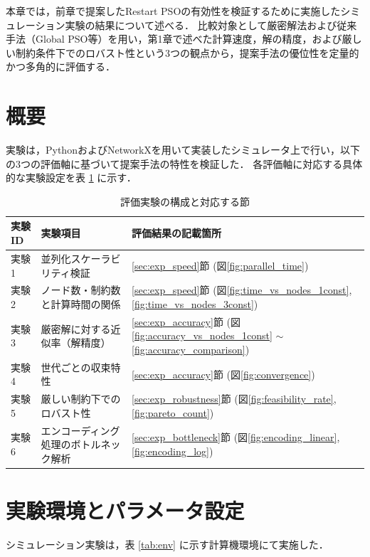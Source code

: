 
本章では，前章で提案したRestart PSOの有効性を検証するために実施したシミュレーション実験の結果について述べる．
比較対象として厳密解法および従来手法（Global PSO等）を用い，第1章で述べた計算速度，解の精度，および厳しい制約条件下でのロバスト性という3つの観点から，提案手法の優位性を定量的かつ多角的に評価する．

\section{概要}
実験は，PythonおよびNetworkXを用いて実装したシミュレータ上で行い，以下の3つの評価軸に基づいて提案手法の特性を検証した．
各評価軸に対応する具体的な実験設定を表 \ref{tab:exp_summary} に示す．

\begin{table}[tb]
  \centering
  \caption{評価実験の構成と対応する節}
  \label{tab:exp_summary}
  \begin{tabular}{l|l|l} \hline
    実験ID & 実験項目 & 評価結果の記載箇所 \\ \hline
    実験1 & 並列化スケーラビリティ検証 & \ref{sec:exp_speed}節 (図\ref{fig:parallel_time}) \\
    実験2 & ノード数・制約数と計算時間の関係 & \ref{sec:exp_speed}節 (図\ref{fig:time_vs_nodes_1const}, \ref{fig:time_vs_nodes_3const}) \\
    実験3 & 厳密解に対する近似率（解精度） & \ref{sec:exp_accuracy}節 (図\ref{fig:accuracy_vs_nodes_1const} $\sim$ \ref{fig:accuracy_comparison}) \\
    実験4 & 世代ごとの収束特性 & \ref{sec:exp_accuracy}節 (図\ref{fig:convergence}) \\
    実験5 & 厳しい制約下でのロバスト性 & \ref{sec:exp_robustness}節 (図\ref{fig:feasibility_rate}, \ref{fig:pareto_count}) \\ \hline
    実験6 & エンコーディング処理のボトルネック解析 & \ref{sec:exp_bottleneck}節 (図\ref{fig:encoding_linear}, \ref{fig:encoding_log}) \\ \hline
  \end{tabular}
\end{table}

\section{実験環境とパラメータ設定}
シミュレーション実験は，表 \ref{tab:env} に示す計算機環境にて実施した．

